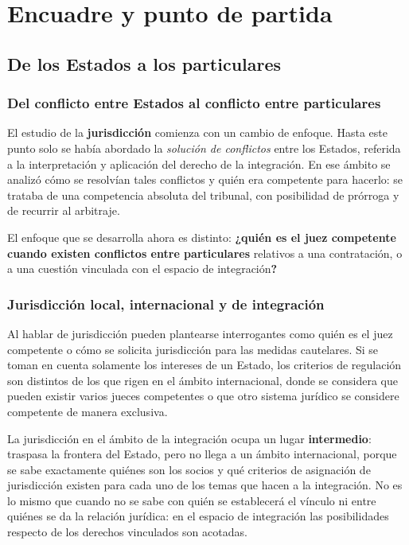 \documentclass[12pt,oneside]{book}
\begin{document}

\chapter[Encuadre y punto de partida]{Encuadre y punto de partida}

\section{De los Estados a los particulares}

\subsection{Del conflicto entre Estados al conflicto entre particulares}

El estudio de la \textbf{jurisdicción} comienza con un cambio de enfoque. Hasta este punto solo se había abordado la \textit{solución de conflictos} entre los Estados, referida a la interpretación y aplicación del derecho de la integración. En ese ámbito se analizó cómo se resolvían tales conflictos y quién era competente para hacerlo: se trataba de una competencia absoluta del tribunal, con posibilidad de prórroga y de recurrir al arbitraje.

El enfoque que se desarrolla ahora es distinto: \textbf{¿quién es el juez competente cuando existen conflictos entre particulares} relativos a una contratación, o a una cuestión vinculada con el espacio de integración\textbf{?}

\subsection{Jurisdicción local, internacional y de integración}

Al hablar de jurisdicción pueden plantearse interrogantes como quién es el juez competente o cómo se solicita jurisdicción para las medidas cautelares. Si se toman en cuenta solamente los intereses de un Estado, los criterios de regulación son distintos de los que rigen en el ámbito internacional, donde se considera que pueden existir varios jueces competentes o que otro sistema jurídico se considere competente de manera exclusiva.

La jurisdicción en el ámbito de la integración ocupa un lugar \textbf{intermedio}: traspasa la frontera del Estado, pero no llega a un ámbito internacional, porque se sabe exactamente quiénes son los socios y qué criterios de asignación de jurisdicción existen para cada uno de los temas que hacen a la integración. No es lo mismo que cuando no se sabe con quién se establecerá el vínculo ni entre quiénes se da la relación jurídica: en el espacio de integración las posibilidades respecto de los derechos vinculados son acotadas.
\end{document}
